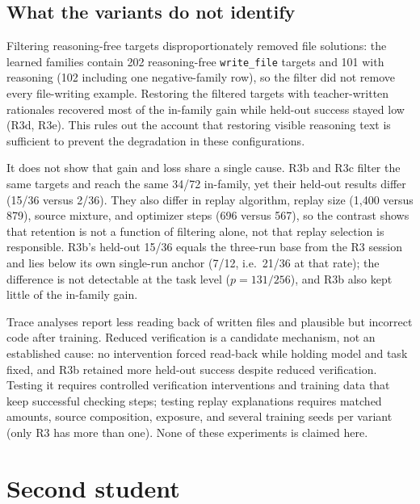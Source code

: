 \documentclass[
  10pt,
]{article}
\begin{document}
\subsection{What the variants do not
identify}\label{what-the-variants-do-not-identify}

Filtering reasoning-free targets disproportionately removed file
solutions: the learned families contain 202 reasoning-free
\texttt{write\_file} targets and 101 with reasoning (102 including one
negative-family row), so the filter did not remove every file-writing
example. Restoring the filtered targets with teacher-written rationales
recovered most of the in-family gain while held-out success stayed low
(R3d, R3e). This rules out the account that restoring visible reasoning
text is sufficient to prevent the degradation in these configurations.

It does not show that gain and loss share a single cause. R3b and R3c
filter the same targets and reach the same 34/72 in-family, yet their
held-out results differ (15/36 versus 2/36). They also differ in replay
algorithm, replay size (1,400 versus 879), source mixture, and optimizer
steps (696 versus 567), so the contrast shows that retention is not a
function of filtering alone, not that replay selection is responsible.
R3b's held-out 15/36 equals the three-run base from the R3 session and
lies below its own single-run anchor (7/12, i.e.~21/36 at that rate);
the difference is not detectable at the task level (\(p=131/256\)), and
R3b also kept little of the in-family gain.

Trace analyses report less reading back of written files and plausible
but incorrect code after training. Reduced verification is a candidate
mechanism, not an established cause: no intervention forced read-back
while holding model and task fixed, and R3b retained more held-out
success despite reduced verification. Testing it requires controlled
verification interventions and training data that keep successful
checking steps; testing replay explanations requires matched amounts,
source composition, exposure, and several training seeds per variant
(only R3 has more than one). None of these experiments is claimed here.

\section{Second student}\label{second-student}
\end{document}

